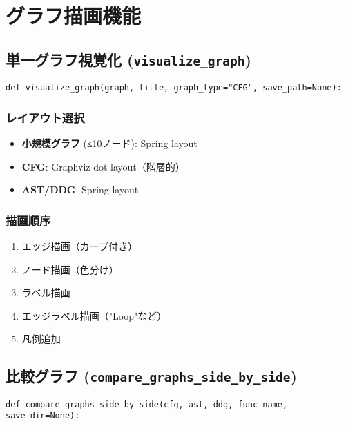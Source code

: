 \documentclass[a4paper,12pt]{article}
\begin{document}
\section{グラフ描画機能}

\subsection{単一グラフ視覚化 (\texttt{visualize\_graph})}

\begin{lstlisting}[caption=単一グラフ視覚化関数]
def visualize_graph(graph, title, graph_type="CFG", save_path=None):
\end{lstlisting}

\subsubsection{レイアウト選択}

\begin{itemize}
    \item \textbf{小規模グラフ} (≤10ノード): Spring layout
    \item \textbf{CFG}: Graphviz dot layout（階層的）
    \item \textbf{AST/DDG}: Spring layout
\end{itemize}

\subsubsection{描画順序}

\begin{enumerate}
    \item エッジ描画（カーブ付き）
    \item ノード描画（色分け）
    \item ラベル描画
    \item エッジラベル描画（"Loop"など）
    \item 凡例追加
\end{enumerate}

\subsection{比較グラフ (\texttt{compare\_graphs\_side\_by\_side})}

\begin{lstlisting}[caption=比較グラフ関数]
def compare_graphs_side_by_side(cfg, ast, ddg, func_name, save_dir=None):
\end{lstlisting}
\end{document}
